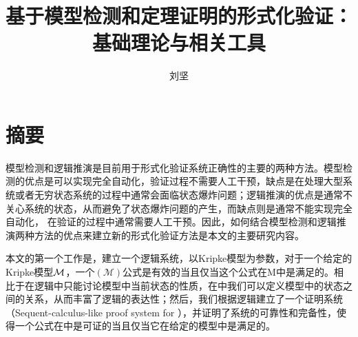  \confidential{}%
  \title[基于模型检测和定理证明的形式化验证：基础理论与相关工具]{基于模型检测和定理证明的形式化验证：基础理论与相关工具}%
  \author{刘坚}%
\maketitle
\makeenglishtitle
\makedeclaration
\chapter{摘\quad 要}%
模型检测和逻辑推演是目前用于形式化验证系统正确性的主要的两种方法。模型检测的优点是可以实现完全自动化，验证过程不需要人工干预，缺点是在处理大型系统或者无穷状态系统的过程中通常会面临状态爆炸问题；逻辑推演的优点是通常不关心系统的状态，从而避免了状态爆炸问题的产生，而缺点则是通常不能实现完全自动化， 在验证的过程中通常需要人工干预。因此，如何结合模型检测和逻辑推演两种方法的优点来建立新的形式化验证方法是本文的主要研究内容。

本文的第一个工作是，建立一个逻辑系统\CTLP{}，\CTLP{}以Kripke模型为参数，对于一个给定的Kripke模型$\cal M$，一个\CTLP$(\mathcal{M})$公式是有效的当且仅当这个公式在M中是满足的。相比于在\CTL{}逻辑中只能讨论模型中当前状态的性质，在\CTLP{}中我们可以定义模型中的状态之间的关系，从而丰富了\CTL{}逻辑的表达性；然后，我们根据逻辑\CTLP{}建立了一个证明系统\SCTL{}（Sequent-calculus-like proof system for \CTLP{}），并证明了\SCTL{}系统的可靠性和完备性，使得一个公式在\SCTL{}中是可证的当且仅当它在给定的模型中是满足的。

